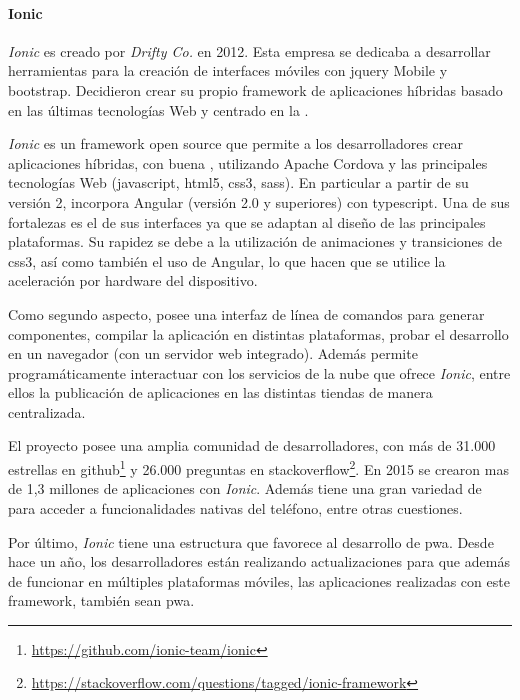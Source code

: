 \paragraph{Ionic}
\label{ionic}

\textit{Ionic} es creado por \textit{Drifty Co.} en 2012. Esta empresa se dedicaba a desarrollar herramientas para la creación de interfaces móviles con \gls{jquery} Mobile y \gls{bootstrap}. Decidieron crear su propio \gls{framework} de aplicaciones híbridas basado en las últimas tecnologías Web y centrado en la .

\textit{Ionic} es un \gls{framework} \gls{open source} que permite a los desarrolladores crear aplicaciones híbridas, con buena , utilizando Apache Cordova y las principales tecnologías Web (\gls{javascript}, \gls{html}5, \gls{css}3, sass). En particular a partir de su versión 2, incorpora Angular (versión 2.0 y superiores) con \gls{typescript}. Una de sus fortalezas es el  de sus interfaces ya que se adaptan al diseño de las principales plataformas\cite{ionic2017concepts}. Su rapidez se debe a la utilización de animaciones y transiciones de \gls{css}3, así como también el uso de Angular, lo que hacen que se utilice la aceleración por hardware del dispositivo\cite{hartington2017animationsIonic}.

Como segundo aspecto, posee una interfaz de línea de comandos para generar componentes, compilar la aplicación en distintas plataformas, probar el desarrollo en un navegador (con un servidor web integrado). Además permite programáticamente interactuar con los servicios de la nube que ofrece \textit{Ionic}, entre ellos la publicación de aplicaciones en las distintas tiendas de manera centralizada.

El proyecto posee una amplia comunidad de desarrolladores, con más de 31.000 estrellas en \gls{github}\footnote{\url{https://github.com/ionic-team/ionic}} y 26.000 preguntas en \gls{stackoverflow}\footnote{\url{https://stackoverflow.com/questions/tagged/ionic-framework}}. En 2015 se crearon mas de 1,3 millones de aplicaciones con \textit{Ionic}\cite{ionic2017concepts}. Además tiene una gran variedad de  para acceder a funcionalidades nativas del teléfono, entre otras cuestiones.

Por último, \textit{Ionic} tiene una estructura que favorece al desarrollo de \gls{pwa}. Desde hace un año, los desarrolladores están realizando actualizaciones para que además de funcionar en múltiples plataformas móviles, las aplicaciones realizadas con este \gls{framework}, también sean \gls{pwa}\cite{lynch2016pwa}.

